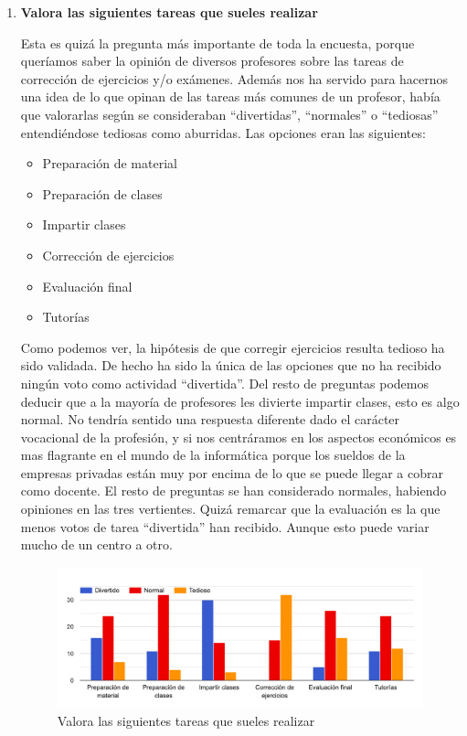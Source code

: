 \begin{enumerate}
\item \textbf{Valora las siguientes tareas que sueles realizar}

Esta es quizá la pregunta más importante de toda la encuesta, porque queríamos saber la opinión de diversos profesores sobre las tareas de corrección de ejercicios y/o exámenes. Además nos ha servido para hacernos una idea de lo que opinan de las tareas más comunes de un profesor, había que valorarlas según se consideraban ``divertidas'', ``normales'' o ``tediosas'' entendiéndose tediosas como aburridas. Las opciones eran las siguientes:

\begin{itemize}
    \item Preparación de material
    \item Preparación de clases
    \item Impartir clases
    \item Corrección de ejercicios
    \item Evaluación final
    \item Tutorías
\end{itemize}

Como podemos ver, la hipótesis de que corregir ejercicios resulta tedioso ha sido validada. De hecho ha sido la única de las opciones que no ha recibido ningún voto como actividad ``divertida''. Del resto de preguntas podemos deducir que a la mayoría de profesores les divierte impartir clases, esto es algo normal. No tendría sentido una respuesta diferente dado el carácter vocacional de la profesión, y si nos centráramos en los aspectos económicos es mas flagrante en el mundo de la informática porque los sueldos de la empresas privadas están muy por encima de lo que se puede llegar a cobrar como docente. El resto de preguntas se han considerado normales, habiendo opiniones en las tres vertientes. Quizá remarcar que la evaluación es la que menos votos de tarea ``divertida'' han recibido. Aunque esto puede variar mucho de un centro a otro.

\begin{figure}[H]
\centering
\includegraphics[width=1.0\textwidth]{../images/quiz_2}
\caption{Valora las siguientes tareas que sueles realizar}
\label{fig:quiz_2}
\end{figure}


\end{enumerate}
